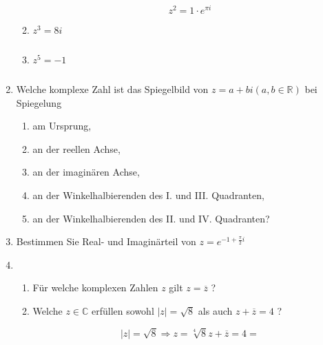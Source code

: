 \documentclass[12pt,a4paper]{scrreprt}
\newcommand{\C}{\mathds{C}}
\newcommand{\R}{\mathds{R}}
\begin{document}
\begin{enumerate}
\begin{enumerate}
\[
z^2=1 \cdot e^{\pi i}
\]

		\item $z^3=8i$

\[
\]

		\item $z^5=-1$

\[
\]

	\end{enumerate}

	\item Welche komplexe Zahl ist das Spiegelbild von $z = a + b i (a, b \in \R)$ bei Spiegelung

	\begin{enumerate}

		\item am Ursprung,

		\item an der reellen Achse,


		\item an der imaginären Achse,


		\item an der Winkelhalbierenden des I. und III. Quadranten,


		\item an der Winkelhalbierenden des II. und IV. Quadranten?


	\end{enumerate}

	\item Bestimmen Sie Real- und Imaginärteil von $z = e^{-	1+ \frac{\pi}{2} i}$

	\item 

	\begin{enumerate}

		\item Für welche komplexen Zahlen $z$ gilt $z = \overline{z}$ ?



		\item Welche $z \in \C$ erfüllen sowohl $|z| = \sqrt{8}$ als auch $z + \overline{z} = 4$ ?

\begin{displaymath}
|z| = \sqrt{8} \Rightarrow z = \sqrt[4]{8}
z + \overline{z} = 4
= 
\end{displaymath}

	\end{enumerate}

\end{enumerate}
\end{document}
